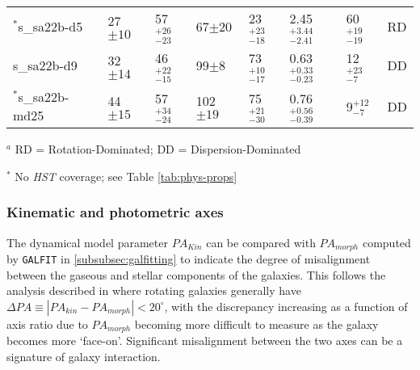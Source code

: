 \documentclass[fleqn,usenatbib]{mn2e}
\begin{document}
\begin{table*}
\begin{threeparttable}
\begin{tabular}{llllllll}
$^{*}$s\_sa22b-d5     & 27$\pm10$                    & 57$^{+26}_{-23}$                     & 67$\pm20$                  & 23$^{+23}_{-18}$          & 2.45$^{+3.44}_{-2.41}$               & 60$^{+19}_{-19}$ & RD   \\[1ex]
s\_sa22b-d9     & 32$\pm14$                    & 46$^{+22}_{-15}$                     & 99$\pm8$                  & 73$^{+10}_{-17}$             & 0.63$^{+0.33}_{-0.23}$                 & 12$^{+23}_{-7}$ & DD   \\[1ex]
$^{*}$s\_sa22b-md25   & 44$\pm15$           & 57$^{+34}_{-24}$                     & 102$\pm19$   & 75$^{+21}_{-30}$                   & 0.76$^{+0.56}_{-0.39}$                & 9$^{+12}_{-7}$ & DD

\end{tabular}
\begin{tablenotes}
      \small
      \item $^{a}$ RD = Rotation-Dominated; DD = Dispersion-Dominated
      \item $^{*}$ No {\em HST} coverage; see Table \ref{tab:phys-props}
    \end{tablenotes}
  \end{threeparttable}
  \end{table*}

\subsubsection{Kinematic and photometric axes}\label{subsubsection:kin_and_phot}

The dynamical model parameter $PA_{Kin}$ can be compared with $PA_{morph}$ computed by {\tt GALFIT} in \cref{subsubsec:galfitting} to indicate the degree of misalignment between the gaseous and stellar components of the galaxies.
This follows the analysis described in \citep[e.g.][]{Epinat2008,Epinat2012,Barrera-Ballesteros2014,Barrera-Ballesteros2015,Wisnioski2015,Harrison2017,Swinbank2017} where rotating galaxies generally have $\Delta PA \equiv |PA_{kin}-PA_{morph}| < 20^{\circ}$, with the discrepancy increasing as a function of axis ratio due to $PA_{morph}$ becoming more difficult to measure as the galaxy becomes more `face-on'.
Significant misalignment between the two axes can be a signature of galaxy interaction.
\end{document}
